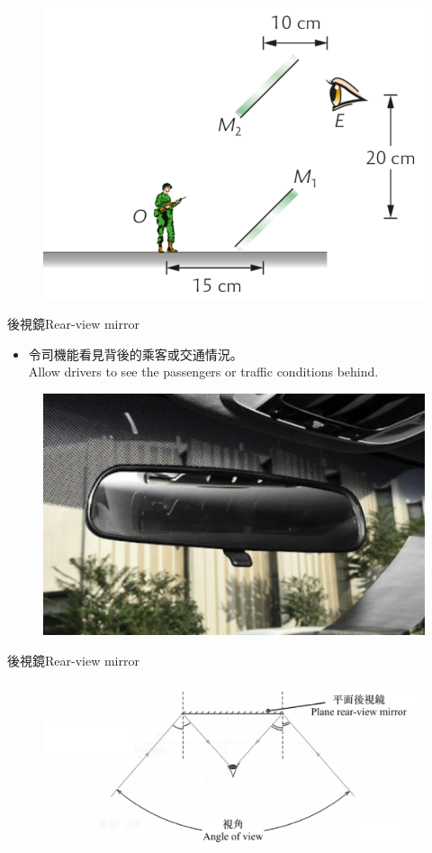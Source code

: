\documentclass[beamer=true]{standalone}
\begin{document}
\begin{eg}
    \begin{figure}
        \centering
        \includegraphics[width=0.5\linewidth]{assets/dq1asd.png}
    \end{figure}
\end{eg}



\begin{frame}{後視鏡Rear-view mirror}
    \begin{itemize}
        \item 令司機能看見背後的乘客或交通情況。\\Allow drivers to see the passengers or traffic conditions behind.
    \end{itemize}\bigskip
    \begin{figure}
        \centering
        \includegraphics[width=0.5\linewidth]{assets/idjioq8jd9d.png}
        
        
    \end{figure}
\end{frame}

\begin{frame}{後視鏡Rear-view mirror}
    \begin{figure}
        \centering
        \includegraphics[width=\linewidth]{assets/dqjioj98dun89n9821.png}
        
        
    \end{figure}
\end{frame}
\end{document}
